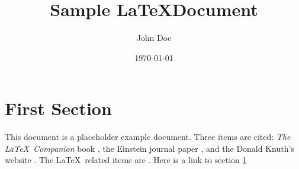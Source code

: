 \documentclass[letterpaper,10pt]{article}
\title{Sample \LaTeX Document}
\author{John Doe}
\date\today
\begin{document}
\maketitle

\tableofcontents

\section{First Section}
\label{sec:one}

This document is a placeholder example document. Three items are cited: \textit{The
\LaTeX\ Companion} book \cite{latexcompanion}, the Einstein journal paper \cite{einstein},
and the Donald Knuth's website \cite{knuthwebsite}. The \LaTeX\ related items are
\cite{latexcompanion,knuthwebsite}. Here is a link to section \hyperref[sec:one]{1}

\medskip


\end{document}
